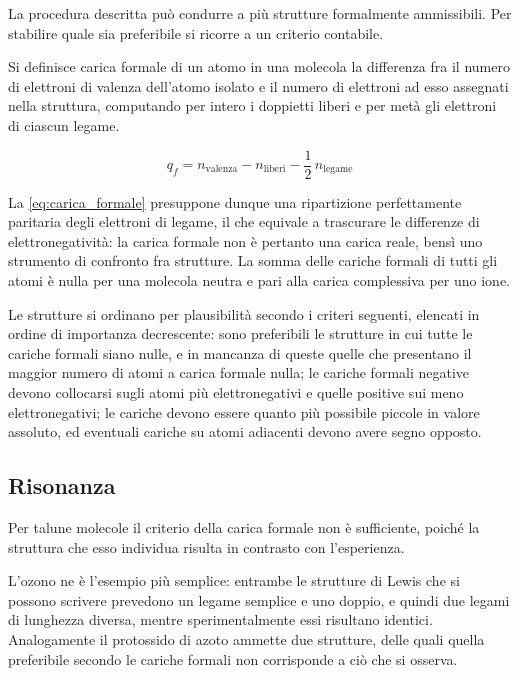 La procedura descritta può condurre a più strutture formalmente ammissibili. Per stabilire quale sia preferibile si ricorre a un criterio contabile.

Si definisce carica formale di un atomo in una molecola la differenza fra il numero di elettroni di valenza dell'atomo isolato e il numero di elettroni ad esso assegnati nella struttura, computando per intero i doppietti liberi e per metà gli elettroni di ciascun legame.

\begin{equation}
    q_f = n_{\text{valenza}} - n_{\text{liberi}} - \frac{1}{2}\,n_{\text{legame}}
    \label{eq:carica_formale}
\end{equation}

La \eqref{eq:carica_formale} presuppone dunque una ripartizione perfettamente paritaria degli elettroni di legame, il che equivale a trascurare le differenze di elettronegatività: la carica formale non è pertanto una carica reale, bensì uno strumento di confronto fra strutture. La somma delle cariche formali di tutti gli atomi è nulla per una molecola neutra e pari alla carica complessiva per uno ione.

Le strutture si ordinano per plausibilità secondo i criteri seguenti, elencati in ordine di importanza decrescente: sono preferibili le strutture in cui tutte le cariche formali siano nulle, e in mancanza di queste quelle che presentano il maggior numero di atomi a carica formale nulla; le cariche formali negative devono collocarsi sugli atomi più elettronegativi e quelle positive sui meno elettronegativi; le cariche devono essere quanto più possibile piccole in valore assoluto, ed eventuali cariche su atomi adiacenti devono avere segno opposto.

\subsection{Risonanza}

Per talune molecole il criterio della carica formale non è sufficiente, poiché la struttura che esso individua risulta in contrasto con l'esperienza.

L'ozono ne è l'esempio più semplice: entrambe le strutture di Lewis che si possono scrivere prevedono un legame semplice e uno doppio, e quindi due legami di lunghezza diversa, mentre sperimentalmente essi risultano identici. Analogamente il protossido di azoto ammette due strutture, delle quali quella preferibile secondo le cariche formali non corrisponde a ciò che si osserva.

